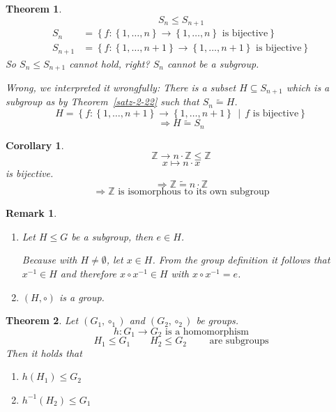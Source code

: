 \documentclass[a4paper,landscape,twocolumn]{article}
\newcommand\set[1]{\left\{#1\right\}}
\newcommand\setdef[2]{\left\{#1\,\middle|\,#2\right\}}
\newtheorem{theorem}{Theorem}
\newtheorem{rem}{Remark}
\newtheorem{cor}{Corollary}
\begin{document}
\begin{theorem}
  \[ S_n \leq S_{n+1} \]
  \begin{align*}
    S_n &= \set{f: \set{1, \dots, n} \rightarrow \set{1, \dots, n} \text{ is bijective}} \\
    S_{n+1} &= \set{f: \set{1, \dots, n+1} \rightarrow \set{1, \dots, n+1} \text{ is bijective}}
  \end{align*}
  So $S_n \leq S_{n+1}$ cannot hold, right? $S_n$ cannot be a subgroup.

  Wrong, we interpreted it wrongfully:
  There is a subset $H \subseteq S_{n+1}$ which is a subgroup as by Theorem~\ref{satz-2-22}
  such that $S_n \tilde{=} H$.
  \[ H = \setdef{f: \set{1, \dots, n+1} \rightarrow \set{1, \dots, n+1}}{f \text{ is bijective}} \]
  \[ \Rightarrow H \tilde{=} S_n \]
\end{theorem}

\begin{cor}
  \[ \mathbb Z \rightarrow n \cdot \mathbb Z \leq \mathbb Z \]
  \[ x \mapsto n \cdot x \]
  is bijective.
  \[ \Rightarrow \mathbb Z \tilde{=} n \cdot \mathbb Z \]
  \[ \Rightarrow \mathbb Z \text{ is isomorphous to its own subgroup} \]
\end{cor}

\begin{rem}
  \begin{enumerate}
    \item
      Let $H \leq G$ be a subgroup, then $e \in H$.

      Because with $H \neq \emptyset$, let $x \in H$.
      From the group definition it follows that $x^{-1} \in H$
      and therefore $x \circ x^{-1} \in H$ with $x \circ x^{-1} = e$.
    \item $(H, \circ)$ is a group.
  \end{enumerate}
\end{rem}

\begin{theorem}
  Let $(G_1, \circ_1)$ and $(G_2, \circ_2)$ be groups.
  \[ h: G_1 \rightarrow G_2 \text{ is a homomorphism} \]
  \[ H_1 \leq G_1 \qquad H_2 \leq G_2 \qquad \text{ are subgroups} \]
  Then it holds that
  \begin{enumerate}
    \item $h(H_1) \leq G_2$
    \item $h^{-1}(H_2) \leq G_1$
  \end{enumerate}
\end{theorem}
\end{document}

